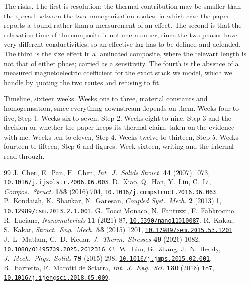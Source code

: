\documentclass[11pt]{article}
\newcommand{\doi}[1]{\href{https://doi.org/#1}{\texttt{#1}}}
\begin{document}
The risks. The first is resolution: the thermal contribution may be smaller than the spread between the two
homogenisation routes, in which case the paper reports a bound rather than a measurement of an effect. The
second is that the relaxation time of the composite is not one number, since the two phases have very
different conductivities, so an effective lag has to be defined and defended. The third is the size effect in
a laminated composite, where the relevant length is not that of either phase; carried as a sensitivity. The
fourth is the absence of a measured magnetoelectric coefficient for the exact stack we model, which we handle
by quoting the two routes and refusing to fit.

Timeline, sixteen weeks. Weeks one to three, material constants and homogenisation, since everything
downstream depends on them. Weeks four to five, Step 1. Weeks six to seven, Step 2. Weeks eight to nine,
Step 3 and the decision on whether the paper keeps its thermal claim, taken on the evidence with me.
Weeks ten to eleven, Step 4. Weeks twelve to thirteen, Step 5. Weeks fourteen to fifteen, Step 6 and figures.
Week sixteen, writing and the internal read-through.

\begin{thebibliography}{99}
\small
{} J.~Chen, E.~Pan, H.~Chen, \emph{Int.\ J.\ Solids Struct.} \textbf{44} (2007) 1073, \doi{10.1016/j.ijsolstr.2006.06.003}.
 D.~Xiao, Q.~Han, Y.~Liu, C.~Li, \emph{Compos.\ Struct.} \textbf{153} (2016) 704, \doi{10.1016/j.compstruct.2016.06.063}.
 P.~Kondaiah, K.~Shankar, N.~Ganesan, \emph{Coupled Syst.\ Mech.} \textbf{2} (2013) 1, \doi{10.12989/csm.2013.2.1.001}.
 G.~Tocci Monaco, N.~Fantuzzi, F.~Fabbrocino, R.~Luciano, \emph{Nanomaterials} \textbf{11} (2021) 87, \doi{10.3390/nano11010087}.
 R.~Kakar, S.~Kakar, \emph{Struct.\ Eng.\ Mech.} \textbf{53} (2015) 1201, \doi{10.12989/sem.2015.53.1201}.
 J.~L.~Matlam, G.~D.~Kedar, \emph{J.\ Therm.\ Stresses} \textbf{49} (2026) 1082, \doi{10.1080/01495739.2025.2612316}.
 C.~W.~Lim, G.~Zhang, J.~N.~Reddy, \emph{J.\ Mech.\ Phys.\ Solids} \textbf{78} (2015) 298, \doi{10.1016/j.jmps.2015.02.001}.
 R.~Barretta, F.~Marotti de Sciarra, \emph{Int.\ J.\ Eng.\ Sci.} \textbf{130} (2018) 187, \doi{10.1016/j.ijengsci.2018.05.009}.
\end{thebibliography}
\end{document}
